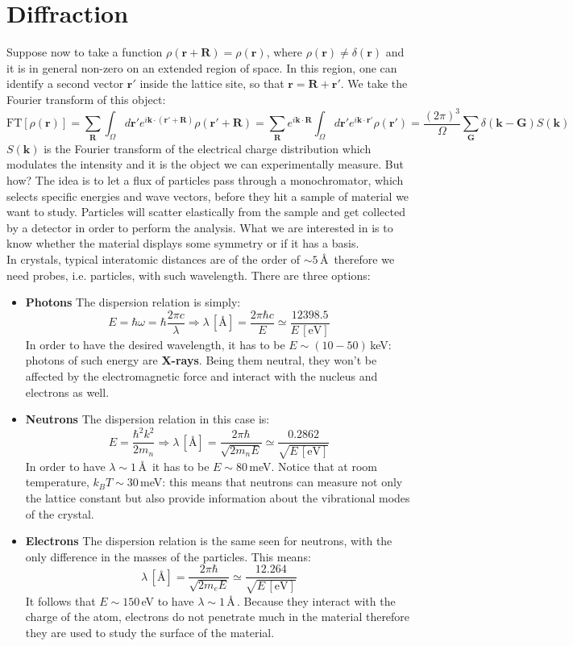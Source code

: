\documentclass[10.75pt,a4paper,openright,bottom=2cm]{article}
\renewcommand{\Vec}[1]{\boldsymbol{#1}}
\begin{document}
\section{Diffraction}
Suppose now to take a function $\rho(\Vec{r}+\Vec{R})=\rho(\Vec{r})$, where $\rho(\Vec{r})\neq\delta(\Vec{r})$ and it is in general non-zero on an extended region of space. In this region, one can identify a second vector $\Vec{r'}$ inside the lattice site, so that $\Vec{r}=\Vec{R}+\Vec{r'}$. We take the Fourier transform of this object:
\[
\text{FT}[\rho(\Vec{r})]=\sum_{\Vec{R}}\int_\Omega d\Vec{r'}e^{i\Vec{k}\cdot(\Vec{r'}+\Vec{R})}\rho(\Vec{r'}+\Vec{R})=\sum_{\Vec{R}}e^{i\Vec{k}\cdot\Vec{R}}\int_\Omega d\Vec{r'}e^{i\Vec{k}\cdot\Vec{r'}}\rho(\Vec{r'})=\frac{(2\pi)^3}{\Omega}\sum_{\Vec{G}}\delta(\Vec{k}-\Vec{G})S(\Vec{k})
\]
$S(\Vec{k})$ is the Fourier transform of the electrical charge distribution which modulates the intensity and it is the object we can experimentally measure. But how? The idea is to let a flux of particles pass through a monochromator, which selects specific energies and wave vectors, before they hit a sample of material we want to study. Particles will scatter elastically from the sample and get collected by a detector in order to perform the analysis. What we are interested in is to know whether the material displays some symmetry or if it has a basis.\\
In crystals, typical interatomic distances are of the order of $\sim5$\,\AA\, therefore we need probes, i.e. particles, with such wavelength. There are three options:
\begin{itemize}
    \item \textbf{Photons} The dispersion relation is simply:
    \[
    E=\hbar\omega=\hbar\frac{2\pi c}{\lambda}\Rightarrow\lambda\,[\text{\AA}]=\frac{2\pi\hbar c}{E}\simeq\frac{12398.5}{E\,[\text{eV}]}
    \]
    In order to have the desired wavelength, it has to be $E\sim(10-50)\,$keV: photons of such energy are \textbf{X-rays}. Being them neutral, they won't be affected by the electromagnetic force and interact with the nucleus and electrons as well.
    \item \textbf{Neutrons} The dispersion relation in this case is:
    \[
    E=\frac{\hbar^2k^2}{2m_n}\Rightarrow\lambda\,[\text{\AA}]=\frac{2\pi\hbar}{\sqrt{2m_nE}}\simeq\frac{0.2862}{\sqrt{E\,[\text{eV}]}}
    \]
    In order to have $\lambda\sim1$\,\AA\, it has to be $E\sim80$\,meV. Notice that at room temperature, $k_BT\sim30$\,meV: this means that neutrons can measure not only the lattice constant but also provide information about the vibrational modes of the crystal.
    \item \textbf{Electrons} The dispersion relation is the same seen for neutrons, with the only difference in the masses of the particles. This means:
    \[
    \lambda\,[\text{\AA}]=\frac{2\pi\hbar}{\sqrt{2m_eE}}\simeq\frac{12.264}{\sqrt{E\,[\text{eV}]}}
    \]
    It follows that $E\sim150$\,eV to have $\lambda\sim1$\,\AA\,. Because they interact with the charge of the atom, electrons do not penetrate much in the material therefore they are used to study the surface of the material.
\end{itemize}
\end{document}
